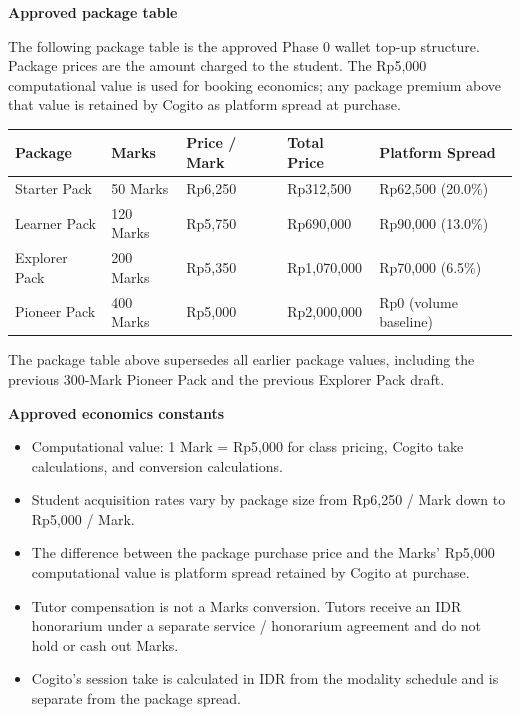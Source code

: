 \documentclass[11pt,a4paper]{article}
\begin{document}
\textbf{Approved package table}

The following package table is the approved Phase 0 wallet top-up structure. Package prices are the amount charged to the student. The Rp5,000 computational value is used for booking economics; any package premium above that value is retained by Cogito as platform spread at purchase.

\begin{tabular}{|p{2.4cm}|p{1.4cm}|p{2.5cm}|p{2.5cm}|p{3.1cm}|}
\hline
\textbf{Package} & \textbf{Marks} & \textbf{Price / Mark} & \textbf{Total Price} & \textbf{Platform Spread} \\
\hline
Starter Pack & 50 Marks & Rp6,250 & Rp312,500 & Rp62,500 (20.0\%) \\
\hline
Learner Pack & 120 Marks & Rp5,750 & Rp690,000 & Rp90,000 (13.0\%) \\
\hline
Explorer Pack & 200 Marks & Rp5,350 & Rp1,070,000 & Rp70,000 (6.5\%) \\
\hline
Pioneer Pack & 400 Marks & Rp5,000 & Rp2,000,000 & Rp0 (volume baseline) \\
\hline
\end{tabular}

The package table above supersedes all earlier package values, including the previous 300-Mark Pioneer Pack and the previous Explorer Pack draft.

\textbf{Approved economics constants}
\begin{itemize}
    \item Computational value: 1 Mark = Rp5,000 for class pricing, Cogito take calculations, and conversion calculations.
    \item Student acquisition rates vary by package size from Rp6,250 / Mark down to Rp5,000 / Mark.
    \item The difference between the package purchase price and the Marks' Rp5,000 computational value is platform spread retained by Cogito at purchase.
    \item Tutor compensation is not a Marks conversion. Tutors receive an IDR honorarium under a separate service / honorarium agreement and do not hold or cash out Marks.
    \item Cogito's session take is calculated in IDR from the modality schedule and is separate from the package spread.
\end{itemize}
\end{document}
